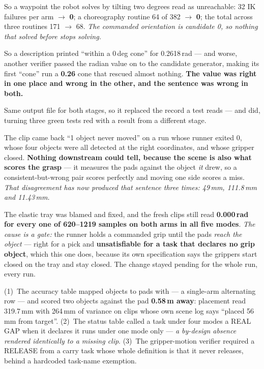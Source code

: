 {So a waypoint the robot solves by tilting two degrees read as unreachable:
32 IK failures per arm $\rightarrow$ \textbf{0}; a choreography routine 64 of 382
$\rightarrow$ \textbf{0}; the total across three routines 171 $\rightarrow$ 68.
\emph{The commanded orientation is candidate 0, so nothing that solved before
stops solving.}}

{So a description printed ``within a 0\,deg cone'' for 0.2618\,rad --- and worse,
another verifier passed the radian value on to the candidate generator, making
its first ``cone'' run a \textbf{0.26\dg{}} cone that rescued almost nothing.
\textbf{The value was right in one place and wrong in the other, and the sentence
was wrong in both.}}

{Same output file for both stages, so it replaced the record a test reads ---
and did, turning three green tests red with a result from a different stage.}

{The clip came back ``1 object never moved'' on a run whose runner exited 0,
whose four objects were all detected at the right coordinates, and whose gripper
closed. \textbf{Nothing downstream could tell, because the scene is also what
scores the grasp} --- it measures the pads against the object \emph{it} drew, so
a consistent-but-wrong pair scores perfectly and moving one side scores a miss.
\emph{That disagreement has now produced that sentence three times: 49\,mm,
111.8\,mm and 11.43\,mm.}}

{The elastic tray was blamed and fixed, and the fresh clips still read
\textbf{0.000\,rad for every one of 620--1219 samples on both arms in all five
modes}. \textit{The cause is a gate:} the runner holds a commanded grip until the
pads \emph{reach the object} --- right for a pick and \textbf{unsatisfiable for a
task that declares no grip object}, which this one does, because its own
specification says the grippers start closed on the tray and stay closed. The
change stayed pending for the whole run, every run.}

{(1)~The accuracy table mapped objects to pads with  --- a
single-arm alternating row --- and scored two objects against the pad
\textbf{0.58\,m away}: placement read 319.7\,mm with 264\,mm of variance on clips
whose own scene log says ``placed 56\,mm from target''. (2)~The status table
called a task under four modes a REAL GAP when it declares it runs under one mode
only --- \emph{a by-design absence rendered identically to a missing clip}.
(3)~The gripper-motion verifier required a RELEASE from a carry task whose whole
definition is that it never releases, behind a hardcoded task-name exemption.}

